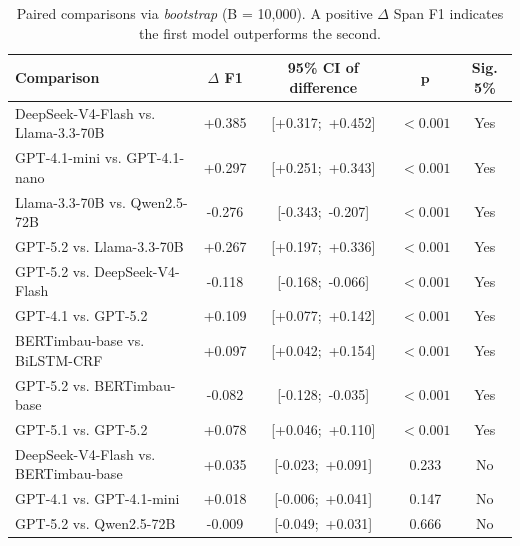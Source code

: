 \begin{table}[ht]
    \centering
    \caption{Paired comparisons via \textit{bootstrap} (B = 10,000). A positive $\Delta$ Span F1 indicates the first model outperforms the second.}
    \label{tab:bootstrap_paired}
    \small
    \begin{tabular}{lcccc}
        \hline
        \textbf{Comparison} & $\Delta$ \textbf{F1} & \textbf{95\% CI of difference} & $\mathbf{p}$ & \textbf{Sig. 5\%} \\
        \hline
        DeepSeek-V4-Flash vs. Llama-3.3-70B & +0.385 & [+0.317;\ +0.452] & $< 0.001$ & Yes \\
        GPT-4.1-mini vs. GPT-4.1-nano & +0.297 & [+0.251;\ +0.343] & $< 0.001$ & Yes \\
        Llama-3.3-70B vs. Qwen2.5-72B & -0.276 & [-0.343;\ -0.207] & $< 0.001$ & Yes \\
        GPT-5.2 vs. Llama-3.3-70B & +0.267 & [+0.197;\ +0.336] & $< 0.001$ & Yes \\
        GPT-5.2 vs. DeepSeek-V4-Flash & -0.118 & [-0.168;\ -0.066] & $< 0.001$ & Yes \\
        GPT-4.1 vs. GPT-5.2 & +0.109 & [+0.077;\ +0.142] & $< 0.001$ & Yes \\
        BERTimbau-base vs. BiLSTM-CRF & +0.097 & [+0.042;\ +0.154] & $< 0.001$ & Yes \\
        GPT-5.2 vs. BERTimbau-base & -0.082 & [-0.128;\ -0.035] & $< 0.001$ & Yes \\
        GPT-5.1 vs. GPT-5.2 & +0.078 & [+0.046;\ +0.110] & $< 0.001$ & Yes \\
        DeepSeek-V4-Flash vs. BERTimbau-base & +0.035 & [-0.023;\ +0.091] & 0.233 & No \\
        GPT-4.1 vs. GPT-4.1-mini & +0.018 & [-0.006;\ +0.041] & 0.147 & No \\
        GPT-5.2 vs. Qwen2.5-72B & -0.009 & [-0.049;\ +0.031] & 0.666 & No \\
        \hline
    \end{tabular}
\end{table}
